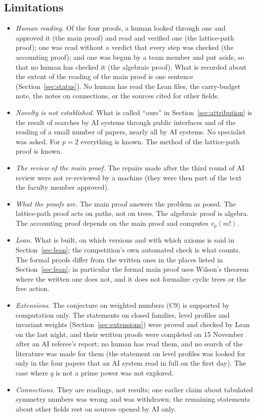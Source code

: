 \documentclass[11pt]{article}
\theoremstyle{definition}
\theoremstyle{remark}
\numberwithin{equation}{section}
\numberwithin{figure}{section}
\begin{document}
\subsection{Limitations}
\begin{itemize}[itemsep=1pt]
\item \emph{Human reading.} Of the four proofs, a human looked through one and approved it (the main proof)
 and read and verified one (the lattice-path proof); one was read without a verdict that every step was
 checked (the accounting proof); and one was begun by a team member and put aside, so that no human has
 checked it (the algebraic proof). What is recorded about the extent of the reading of the main
 proof is one sentence (Section~\ref{sec:status}). No human has read the Lean files, the carry-budget note,
 the notes on connections, or the sources cited for other fields.
\item \emph{Novelty is not established.} What is called ``ours'' in Section~\ref{sec:attribution} is the
 result of searches by AI systems through public interfaces and of the reading of a small number of papers,
 nearly all by AI systems. No specialist was asked. For $p=2$ everything is known. The method of the
 lattice-path proof is known.
\item \emph{The review of the main proof.} The repairs made after the third round of AI review were not
 re-reviewed by a machine (they were then part of the text the faculty member approved).
\item \emph{What the proofs are.} The main proof answers the problem as posed. The lattice-path proof acts
 on paths, not on trees. The algebraic proof is algebra. The accounting proof depends on the main proof and
 computes $v_p(m!)$.
\item \emph{Lean.} What is built, on which versions and with which axioms is said in Section~\ref{sec:lean};
 the competition's own automated check is what counts. The formal proofs differ from the written ones in the
 places listed in Section~\ref{sec:lean}; in particular the formal main proof uses Wilson's theorem where the written one
 does not, and it does not formalize cyclic trees or the free action.
\item \emph{Extensions.} The conjecture on weighted numbers (C9) is supported by computation only. The
 statements on closed families, level profiles and invariant weights (Section~\ref{sec:extensions}) were
 proved and checked by Lean on the last night, and their written proofs were completed on 15 November after
 an AI referee's report; no human has read them, and no search of the literature was made for them (the
 statement on level profiles was looked for only in the four papers that an AI system read in full on the
 first day). The case where $q$ is not a prime power was not explored.
\item \emph{Connections.} They are readings, not results; one earlier claim about tabulated symmetry numbers
 was wrong and was withdrawn; the remaining statements about other fields rest on sources opened by AI only.
\end{itemize}
\end{document}

